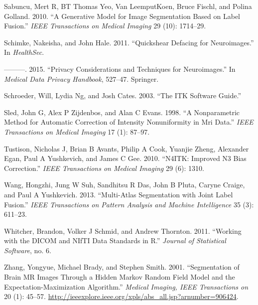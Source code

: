 \documentclass[]{elsarticle} %
\begin{document}
\leavevmode\hypertarget{ref-sabuncu2010generative}{}%
Sabuncu, Mert R, BT Thomas Yeo, Van LeemputKoen, Bruce Fischl, and Polina Golland. 2010. ``A Generative Model for Image Segmentation Based on Label Fusion.'' \emph{IEEE Transactions on Medical Imaging} 29 (10): 1714--29.

\leavevmode\hypertarget{ref-quickshear}{}%
Schimke, Nakeisha, and John Hale. 2011. ``Quickshear Defacing for Neuroimages.'' In \emph{HealthSec}.

\leavevmode\hypertarget{ref-schimke2015privacy}{}%
---------. 2015. ``Privacy Considerations and Techniques for Neuroimages.'' In \emph{Medical Data Privacy Handbook}, 527--47. Springer.

\leavevmode\hypertarget{ref-itk}{}%
Schroeder, Will, Lydia Ng, and Josh Cates. 2003. ``The ITK Software Guide.''

\leavevmode\hypertarget{ref-sled1998nonparametric}{}%
Sled, John G, Alex P Zijdenbos, and Alan C Evans. 1998. ``A Nonparametric Method for Automatic Correction of Intensity Nonuniformity in Mri Data.'' \emph{IEEE Transactions on Medical Imaging} 17 (1): 87--97.

\leavevmode\hypertarget{ref-n4}{}%
Tustison, Nicholas J, Brian B Avants, Philip A Cook, Yuanjie Zheng, Alexander Egan, Paul A Yushkevich, and James C Gee. 2010. ``N4ITK: Improved N3 Bias Correction.'' \emph{IEEE Transactions on Medical Imaging} 29 (6): 1310.

\leavevmode\hypertarget{ref-malf}{}%
Wang, Hongzhi, Jung W Suh, Sandhitsu R Das, John B Pluta, Caryne Craige, and Paul A Yushkevich. 2013. ``Multi-Atlas Segmentation with Joint Label Fusion.'' \emph{IEEE Transactions on Pattern Analysis and Machine Intelligence} 35 (3): 611--23.

\leavevmode\hypertarget{ref-orodicom}{}%
Whitcher, Brandon, Volker J Schmid, and Andrew Thornton. 2011. ``Working with the DICOM and NIfTI Data Standards in R.'' \emph{Journal of Statistical Software}, no. 6.

\leavevmode\hypertarget{ref-zhang_segmentation_2001}{}%
Zhang, Yongyue, Michael Brady, and Stephen Smith. 2001. ``Segmentation of Brain MR Images Through a Hidden Markov Random Field Model and the Expectation-Maximization Algorithm.'' \emph{Medical Imaging, IEEE Transactions on} 20 (1): 45--57. \url{http://ieeexplore.ieee.org/xpls/abs_all.jsp?arnumber=906424}.
\end{document}
